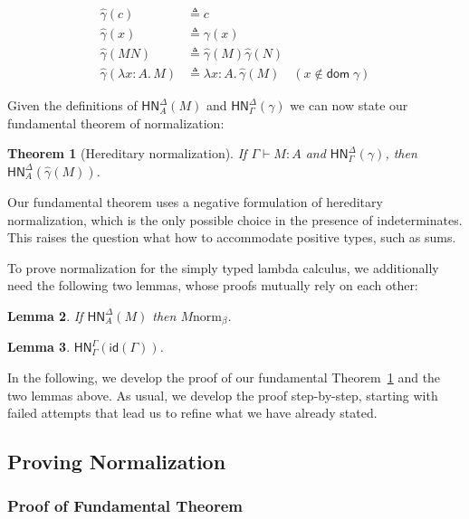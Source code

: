 \documentclass{article}
\newtheorem{thm}{Theorem}
\newtheorem{lem}[thm]{Lemma}
\newcommand{\hasEF}[3]{\ensuremath{#1 \vdash #2 : #3}}
\newcommand{\bnorm}[1]{\ensuremath{#1 \mathrel{\text{norm}_\beta}}}
\newcommand{\hnorm}[3]{\ensuremath{\mathsf{HN}^{#1}_{#2}(#3)}}
\newcommand{\id}[1]{\ensuremath{\mathsf{id}(#1)}}
\newcommand{\lam}[3]{\ensuremath{\lambda #1 {:} #2.\, #3}}
\begin{document}
\begin{align*}
\hat{\gamma}(c) &\triangleq c\\
\hat{\gamma}(x) &\triangleq \gamma(x)\\
\hat{\gamma}(M N) &\triangleq \hat{\gamma}(M) \hat{\gamma}(N)\\
\hat{\gamma}(\lam{x}{A}{M}) &\triangleq \lam{x}{A}{\hat{\gamma}(M)} \quad (x \notin \mathsf{dom}\; \gamma)
\end{align*}

Given the definitions of $\hnorm{\Delta}{A}{M}$ and $\hnorm{\Delta}{\Gamma}{\gamma}$ we can now
state our fundamental theorem of normalization:

\begin{thm}[Hereditary normalization]\label{thm:hnorm}
If $\hasEF{\Gamma}{M}{A}$ and $\hnorm{\Delta}{\Gamma}{\gamma}$, then $\hnorm{\Delta}{A}{\hat\gamma(M)}$.
\end{thm}

Our fundamental theorem uses a negative formulation of hereditary normalization, which is the
only possible choice in the presence of indeterminates.  This raises the question what how to
accommodate positive types, such as sums.

To prove normalization for the simply typed lambda calculus, we additionally need the following
two lemmas, whose proofs mutually rely on each other:

\begin{lem}\label{l2}
If $\hnorm{\Delta}{A}{M}$ then $\bnorm{M}$.
\end{lem}

\begin{lem}\label{l3}
$\hnorm{\Gamma}{\Gamma}{\id{\Gamma}}$.
\end{lem}

In the following, we develop the proof of our fundamental Theorem~\ref{thm:hnorm} and the two
lemmas above.  As usual, we develop the proof step-by-step, starting with failed attempts that
lead us to refine what we have already stated.

\subsection{Proving Normalization}

\subsubsection{Proof of Fundamental Theorem}
\end{document}
